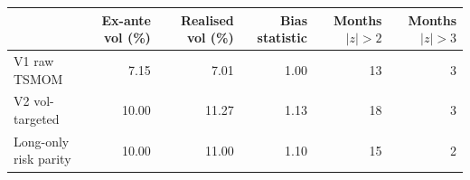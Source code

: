 \begin{tabular}{lrrrrr}
\toprule
 & Ex-ante vol (\%) & Realised vol (\%) & Bias statistic & Months $|z|>2$ & Months $|z|>3$ \\
\midrule
V1 raw TSMOM & 7.15 & 7.01 & 1.00 & 13 & 3 \\
V2 vol-targeted & 10.00 & 11.27 & 1.13 & 18 & 3 \\
Long-only risk parity & 10.00 & 11.00 & 1.10 & 15 & 2 \\
\bottomrule
\end{tabular}
